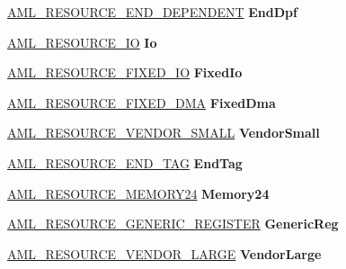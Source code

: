 \begin{DoxyCompactItemize}
\hyperlink{structaml__resource__end__dependent}{A\+M\+L\+\_\+\+R\+E\+S\+O\+U\+R\+C\+E\+\_\+\+E\+N\+D\+\_\+\+D\+E\+P\+E\+N\+D\+E\+NT} {\bfseries End\+Dpf}
\item 
\mbox{\label{unionaml__resource_a628d40a259ab251e6e05f45cc7c34571}} 
\hyperlink{structaml__resource__io}{A\+M\+L\+\_\+\+R\+E\+S\+O\+U\+R\+C\+E\+\_\+\+IO} {\bfseries Io}
\item 
\mbox{\label{unionaml__resource_a5161cceddd385cb628c85a507559204a}} 
\hyperlink{structaml__resource__fixed__io}{A\+M\+L\+\_\+\+R\+E\+S\+O\+U\+R\+C\+E\+\_\+\+F\+I\+X\+E\+D\+\_\+\+IO} {\bfseries Fixed\+Io}
\item 
\mbox{\label{unionaml__resource_adc6a6b05e1346a9940b136c9b5a016a5}} 
\hyperlink{structaml__resource__fixed__dma}{A\+M\+L\+\_\+\+R\+E\+S\+O\+U\+R\+C\+E\+\_\+\+F\+I\+X\+E\+D\+\_\+\+D\+MA} {\bfseries Fixed\+Dma}
\item 
\mbox{\label{unionaml__resource_a3d14e7bbde7542423a7230f6beb57bac}} 
\hyperlink{structaml__resource__vendor__small}{A\+M\+L\+\_\+\+R\+E\+S\+O\+U\+R\+C\+E\+\_\+\+V\+E\+N\+D\+O\+R\+\_\+\+S\+M\+A\+LL} {\bfseries Vendor\+Small}
\item 
\mbox{\label{unionaml__resource_ac2ba46bcd29b7addef4054c910de46c2}} 
\hyperlink{structaml__resource__end__tag}{A\+M\+L\+\_\+\+R\+E\+S\+O\+U\+R\+C\+E\+\_\+\+E\+N\+D\+\_\+\+T\+AG} {\bfseries End\+Tag}
\item 
\mbox{\label{unionaml__resource_a77758e277472f4986053e58f3f0b33b7}} 
\hyperlink{structaml__resource__memory24}{A\+M\+L\+\_\+\+R\+E\+S\+O\+U\+R\+C\+E\+\_\+\+M\+E\+M\+O\+R\+Y24} {\bfseries Memory24}
\item 
\mbox{\label{unionaml__resource_adfd8f02737cea5f4a7320e9c7328aaa0}} 
\hyperlink{structaml__resource__generic__register}{A\+M\+L\+\_\+\+R\+E\+S\+O\+U\+R\+C\+E\+\_\+\+G\+E\+N\+E\+R\+I\+C\+\_\+\+R\+E\+G\+I\+S\+T\+ER} {\bfseries Generic\+Reg}
\item 
\mbox{\label{unionaml__resource_a788708de275bd04c8110b2324405350f}} 
\hyperlink{structaml__resource__vendor__large}{A\+M\+L\+\_\+\+R\+E\+S\+O\+U\+R\+C\+E\+\_\+\+V\+E\+N\+D\+O\+R\+\_\+\+L\+A\+R\+GE} {\bfseries Vendor\+Large}

\end{DoxyCompactItemize}
